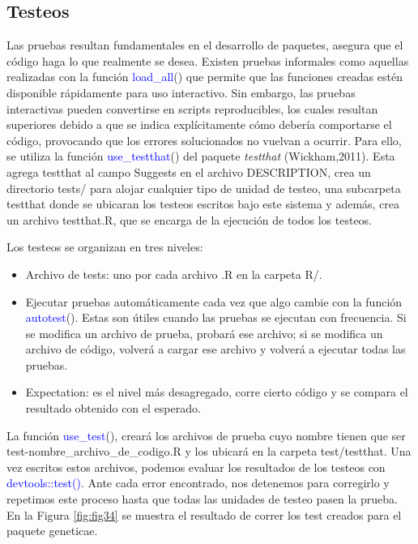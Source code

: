 \subsection{Testeos}

Las pruebas resultan fundamentales en el desarrollo de paquetes, asegura que el código haga lo que realmente se desea. Existen pruebas informales como aquellas realizadas con la función \textcolor{blue}{load\_all}() que permite que las funciones creadas estén disponible rápidamente para uso interactivo. Sin embargo, las pruebas interactivas pueden convertirse en scripts reproducibles, los cuales resultan superiores debido a que se indica explícitamente cómo debería comportarse el código, provocando que los errores solucionados no vuelvan a ocurrir. Para ello, se utiliza la función \textcolor{blue}{use\_testthat}() del paquete \emph{testthat} (Wickham,2011). Esta agrega testthat al campo Suggests en el archivo DESCRIPTION, crea un directorio tests/ para alojar cualquier tipo de unidad de testeo, una subcarpeta testthat donde se ubicaran los testeos escritos bajo este sistema y además, crea un archivo testthat.R, que se encarga de la ejecución de todos los testeos.  

Los testeos se organizan en tres niveles:
\begin{itemize}
\item Archivo de tests: uno por cada archivo .R en la carpeta R/.
\item Ejecutar pruebas automáticamente cada vez que algo cambie con la función \textcolor{blue}{autotest}(). Estas son útiles cuando las pruebas se ejecutan con frecuencia. Si se modifica un archivo de prueba, probará ese archivo; si se modifica un archivo de código, volverá a cargar ese archivo y volverá a ejecutar todas las pruebas.
\item Expectation: es el nivel más desagregado, corre cierto código y se compara el resultado obtenido con el esperado.
\end{itemize}

La función \textcolor{blue}{use\_test}(), creará los archivos de prueba cuyo nombre tienen que ser test-nombre\_archivo\_de\_codigo.R  y los ubicará en la carpeta test/testthat. Una vez escritos estos archivos, podemos evaluar los resultados de los testeos con \textcolor{blue}{devtools::test()}. Ante cada error encontrado, nos detenemos para corregirlo y repetimos este proceso hasta que todas las unidades de testeo pasen la prueba. En la Figura \ref{fig:fig34} se muestra el resultado de correr los test creados para el paquete geneticae.



